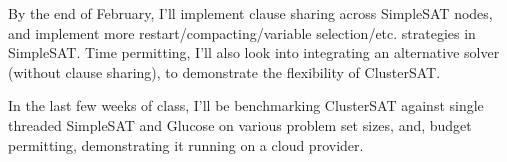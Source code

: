 \documentclass[10pt]{article}
\begin{document}
  By the end of February, I'll implement clause sharing across SimpleSAT nodes, and implement more 
  restart/compacting/variable selection/etc. strategies in SimpleSAT.  Time permitting, I'll also look into integrating an alternative 
  solver (without clause sharing), to demonstrate the flexibility of ClusterSAT.

  In the last few weeks of class, I'll be benchmarking ClusterSAT against single threaded SimpleSAT and Glucose on various
  problem set sizes, and, budget permitting, demonstrating it running on a cloud provider.
\end{document}
